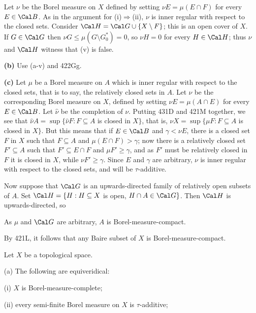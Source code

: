 {Let $\nu$ be the Borel measure on $X$ defined by setting
$\nu E=\mu(E\cap F)$ for every $E\in\Cal B$.   As in the argument for
(i)$\Rightarrow$(ii), $\nu$ is inner regular with respect to the closed
sets.   Consider $\Cal H=\Cal G\cup\{X\setminus F\}$;  this is an open
cover of $X$.   If $G\in\Cal G$ then $\nu G\le\mu(G\setminus G^*_0)=0$,
so $\nu H=0$ for every $H\in\Cal H$;  thus $\nu$ and $\Cal H$ witness
that (v) is false.

\medskip

{\bf (b)} Use (a-v) and 422Gg.

\medskip

{\bf (c)} Let $\mu$ be a Borel measure on $A$ which is inner regular
with respect to the closed sets, that is to say, the relatively closed
sets in $A$.   Let $\nu$ be the corresponding Borel measure on $X$,
defined by setting $\nu E=\mu(A\cap E)$ for every $E\in\Cal B$.   Let
$\hat\nu$ be the completion of $\nu$.   Putting 431D and 421M together,
we see that $\hat\nu A=\sup\{\hat\nu F:F\subseteq A$ is closed in $X\}$,
that is, $\nu X=\sup\{\mu F:F\subseteq A$ is closed in $X\}$.   But this
means that if $E\in\Cal B$ and $\gamma<\nu E$, there is a closed set $F$
in $X$ such that $F\subseteq A$ and $\mu(E\cap F)>\gamma$;  now
there is a relatively closed set $F'\subseteq A$ such that
$F'\subseteq E\cap F$ and $\mu F'\ge\gamma$, and as $F'$ must be
relatively closed in $F$ it is closed in $X$, while $\nu F'\ge\gamma$.
Since $E$ and $\gamma$ are arbitrary, $\nu$ is inner regular with
respect to the closed sets, and will be $\tau$-additive.

Now suppose that $\Cal G$ is an upwards-directed family of relatively
open subsets of $A$.   Set
$\Cal H=\{H:H\subseteq X$ is open, $H\cap A\in\Cal G\}$.   Then $\Cal H$
is upwards-directed, so


\noindent As $\mu$ and $\Cal G$ are arbitrary, $A$ is
Borel-measure-compact.

By 421L, it follows that any Baire subset of $X$ is
Borel-measure-compact.
}%

 Let $X$ be a topological space.

(a) The following are equiveridical:

\quad(i) $X$ is Borel-measure-complete;

\quad(ii) every semi-finite Borel measure on $X$ is $\tau$-additive;

